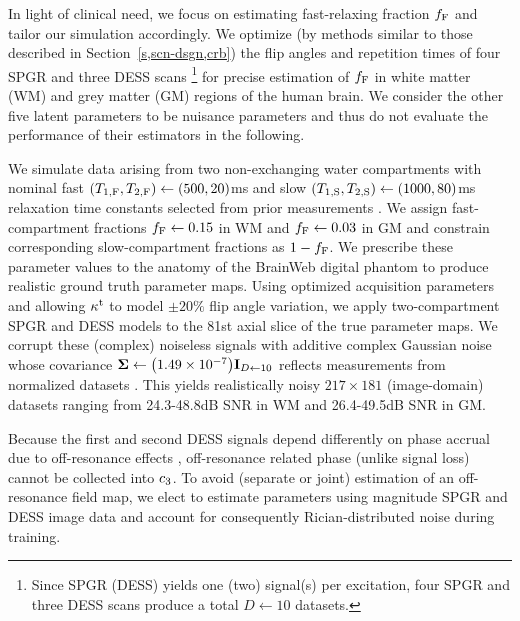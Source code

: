 In light of clinical need,
we focus on estimating fast-relaxing fraction $f_{\mathrm{F}}$
and tailor our simulation accordingly.
We optimize 
(by methods similar to those described in Section~\ref{s,scn-dsgn,crb})
the flip angles and repetition times
of four SPGR and three DESS scans
\footnote{Since SPGR (DESS) yields one (two) signal(s) per excitation,
four SPGR and three DESS scans produce a total $D \gets 10$ datasets.}
for precise estimation of $f_{\mathrm{F}}$ 
in white matter (WM) 
and grey matter (GM) regions 
of the human brain.
We consider the other five latent parameters
to be nuisance parameters
and thus do not evaluate the performance of their estimators
in the following.

We simulate data arising
from two non-exchanging water compartments
with nominal fast 
$\paren{\tf{1},\tf{2}} \gets \paren{500,20}$ms
and slow 
$\paren{\ts{1},\ts{2}} \gets \paren{1000,80}$ms
relaxation time constants 
selected from prior measurements 
\cite{mackay:94:ivv,deoni:11:com}.
We assign fast-compartment fractions
$f_{\mathrm{F}} \gets 0.15$ in WM and
$f_{\mathrm{F}} \gets 0.03$ in GM
and constrain corresponding slow-compartment fractions 
as $1-f_{\mathrm{F}}$.
We prescribe these parameter values 
to the anatomy of the BrainWeb digital phantom
\cite{collins:98:dac}
to produce realistic ground truth parameter maps.
Using optimized acquisition parameters
and allowing $\kappa^{\mathrm{t}}$ to model $\pm20\%$ flip angle variation,
we apply two-compartment SPGR and DESS models
to the 81st axial slice of the true parameter maps.
We corrupt these (complex) noiseless signals
with additive complex Gaussian noise
whose covariance $\bmSig \gets \paren{1.49\times10^{-7}} \eye{D\gets10}$
reflects measurements
from normalized datasets \cite{nataraj::oms}.
This yields realistically noisy $217\times181$ (image-domain) datasets
ranging from 24.3-48.8dB SNR in WM
and 26.4-49.5dB SNR in GM.

Because the first and second DESS signals depend differently
on phase accrual due to off-resonance effects \cite{nataraj::oms},
off-resonance related phase (unlike signal loss) 
cannot be collected into $c_{3}$.
To avoid (separate or joint) estimation
of an off-resonance field map, 
we elect to estimate parameters 
using magnitude SPGR and DESS image data
and account for consequently Rician-distributed noise
during training.

